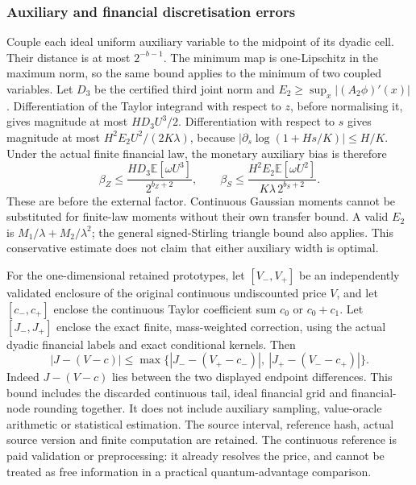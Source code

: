 \subsubsection{Auxiliary and financial discretisation errors}

Couple each ideal uniform auxiliary variable to the midpoint of its dyadic
cell.  Their distance is at most $2^{-b-1}$.  The minimum map is
one-Lipschitz in the maximum norm, so the same bound applies to the minimum
of two coupled variables.  Let $D_3$ be the certified third joint norm and
$E_2\geq\sup_x|(A_2\phi)'(x)|$.  Differentiation of the Taylor integrand
with respect to $z$, before normalising it, gives magnitude at most
$HD_3U^3/2$.  Differentiation with respect to $s$ gives magnitude at most
$H^2E_2U^2/(2K\lambda)$, because
$|\partial_s\log(1+Hs/K)|\leq H/K$.
Under the actual finite financial law, the monetary auxiliary bias is therefore
\begin{equation}
 \beta_Z\leq\frac{HD_3\mathbb E[\omega U^3]}{2^{b_Z+2}},\qquad
 \beta_S\leq\frac{H^2E_2\mathbb E[\omega U^2]}
                         {K\lambda\,2^{b_S+2}}.
 \label{eq:iv-aux-bias}
\end{equation}
These are before the external factor.  Continuous Gaussian moments cannot
be substituted for finite-law moments without their own transfer bound.
A valid $E_2$ is $M_1/\lambda+M_2/\lambda^2$; the general signed-Stirling
triangle bound also applies.  This conservative estimate does not claim
that either auxiliary width is optimal.

For the one-dimensional retained prototypes, let $[V_-,V_+]$ be an
independently validated enclosure of the original continuous undiscounted
price $V$, and let $[c_-,c_+]$ enclose the continuous Taylor coefficient
sum $c_0$ or $c_0+c_1$.  Let $[J_-,J_+]$ enclose the exact finite,
mass-weighted correction, using the actual dyadic financial labels and exact
conditional kernels.  Then
\begin{equation}
 |J-(V-c)|\leq
 \max\{|J_--(V_+-c_-)|,\ |J_+-(V_--c_+)|\}.
 \label{eq:iv-reference-transfer}
\end{equation}
Indeed $J-(V-c)$ lies between the two displayed endpoint differences.  This
bound includes the discarded continuous tail, ideal financial grid and
financial-node rounding together.  It does not include auxiliary sampling,
value-oracle arithmetic or statistical estimation.  The source interval,
reference hash, actual source version and finite computation are retained.
The continuous reference is paid validation or preprocessing: it already
resolves the price, and cannot be treated as free information in a practical
quantum-advantage comparison.

